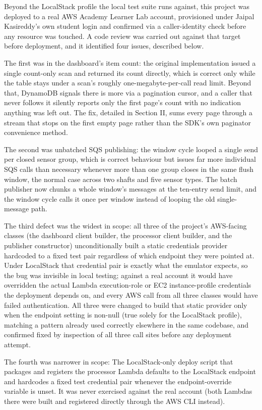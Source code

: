 \documentclass[conference]{IEEEtran}
\begin{document}
Beyond the LocalStack profile the local test suite runs against, this project was deployed to a real AWS Academy Learner Lab account, provisioned under Jaipal Kasireddy's own student login and confirmed via a caller-identity check before any resource was touched. A code review was carried out against that target before deployment, and it identified four issues, described below.

The first was in the dashboard's item count: the original implementation issued a single count-only scan and returned its count directly, which is correct only while the table stays under a scan's roughly one-megabyte-per-call read limit. Beyond that, DynamoDB signals there is more via a pagination cursor, and a caller that never follows it silently reports only the first page's count with no indication anything was left out. The fix, detailed in Section II, sums every page through a stream that stops on the first empty page rather than the SDK's own paginator convenience method.

The second was unbatched SQS publishing: the window cycle looped a single send per closed sensor group, which is correct behaviour but issues far more individual SQS calls than necessary whenever more than one group closes in the same flush window, the normal case across two shafts and five sensor types. The batch publisher now chunks a whole window's messages at the ten-entry send limit, and the window cycle calls it once per window instead of looping the old single-message path.

The third defect was the widest in scope: all three of the project's AWS-facing classes (the dashboard client builder, the processor client builder, and the publisher constructor) unconditionally built a static credentials provider hardcoded to a fixed test pair regardless of which endpoint they were pointed at. Under LocalStack that credential pair is exactly what the emulator expects, so the bug was invisible in local testing; against a real account it would have overridden the actual Lambda execution-role or EC2 instance-profile credentials the deployment depends on, and every AWS call from all three classes would have failed authentication. All three were changed to build that static provider only when the endpoint setting is non-null (true solely for the LocalStack profile), matching a pattern already used correctly elsewhere in the same codebase, and confirmed fixed by inspection of all three call sites before any deployment attempt.

The fourth was narrower in scope: The LocalStack-only deploy script that packages and registers the processor Lambda defaults to the LocalStack endpoint and hardcodes a fixed test credential pair whenever the endpoint-override variable is unset. It was never exercised against the real account (both Lambdas there were built and registered directly through the AWS CLI instead).
\end{document}
